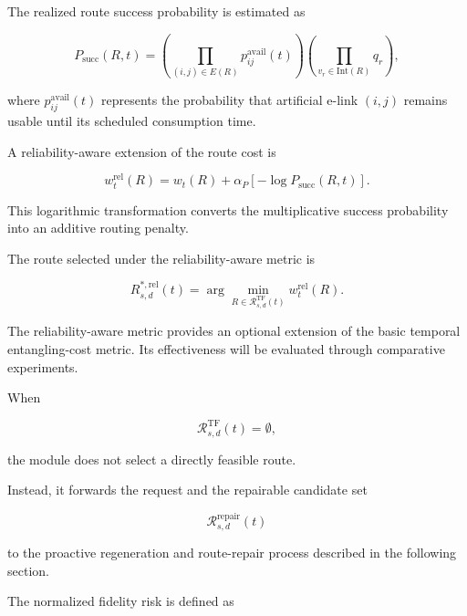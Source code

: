 The realized route success probability is estimated as

\begin{equation}
    P_{\mathrm{succ}}(R,t)
    =
    \left(
    \prod_{
    (i,j)
    \in
    E(R)
    }
    p_{ij}^{\mathrm{avail}}(t)
    \right)
    \left(
    \prod_{
    v_r
    \in
    \mathrm{Int}(R)
    }
    q_r
    \right),
\end{equation}

where $p_{ij}^{\mathrm{avail}}(t)$ represents the probability that artificial e-link $(i,j)$ remains usable until its scheduled consumption time.

A reliability-aware extension of the route cost is

\begin{equation}
    w_t^{\mathrm{rel}}(R)
    =
    w_t(R)
    +
    \alpha_P
    \left[
    -\log
    P_{\mathrm{succ}}(R,t)
    \right].
\end{equation}

This logarithmic transformation converts the multiplicative success probability into an additive routing penalty.

The route selected under the reliability-aware metric is

\begin{equation}
    R_{s,d}^{*,\mathrm{rel}}(t)
    =
    \arg\min_{
    R
    \in
    \mathcal{R}_{s,d}^{\mathrm{TF}}(t)
    }
    w_t^{\mathrm{rel}}(R).
\end{equation}

The reliability-aware metric provides an optional extension of the basic temporal entangling-cost metric. Its effectiveness will be evaluated through comparative experiments.

When

\begin{equation}
    \mathcal{R}_{s,d}^{\mathrm{TF}}(t)
    =
    \emptyset,
\end{equation}

the module does not select a directly feasible route.

Instead, it forwards the request and the repairable candidate set

\begin{equation}
    \mathcal{R}_{s,d}^{\mathrm{repair}}(t)
\end{equation}

to the proactive regeneration and route-repair process described in the following section.

The normalized fidelity risk is defined as

